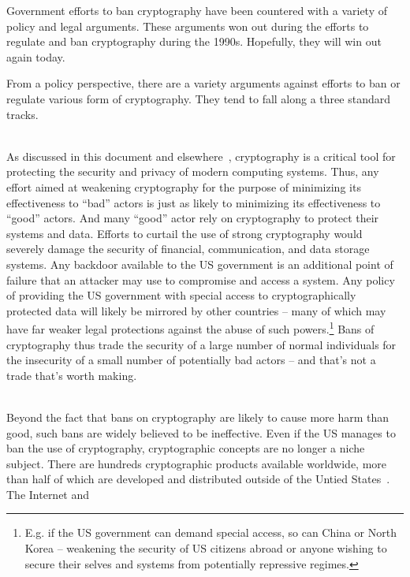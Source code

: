 Government efforts to ban cryptography have been countered with a
variety of policy and legal arguments. These arguments won out during
the efforts to regulate and ban cryptography during the
1990s. Hopefully, they will win out again today.

From a policy perspective, there are a variety arguments against
efforts to ban or regulate various form of cryptography. They tend to
fall along a three standard tracks.


\begin{packed_desc}
\item[More Harm Than Good] \hfill \\ As discussed in this document and
  elsewhere~\cite{abelson2015}, cryptography is a critical tool for
  protecting the security and privacy of modern computing
  systems. Thus, any effort aimed at weakening cryptography for the
  purpose of minimizing its effectiveness to ``bad'' actors is just as
  likely to minimizing its effectiveness to ``good'' actors. And many
  ``good'' actor rely on cryptography to protect their systems and
  data. Efforts to curtail the use of strong cryptography would
  severely damage the security of financial, communication, and data
  storage systems. Any backdoor available to the US government is an
  additional point of failure that an attacker may use to compromise
  and access a system. Any policy of providing the US government with
  special access to cryptographically protected data will likely be
  mirrored by other countries -- many of which may have far weaker
  legal protections against the abuse of such powers.\footnote{E.g. if
    the US government can demand special access, so can China or North
    Korea -- weakening the security of US citizens abroad or anyone
    wishing to secure their selves and systems from potentially
    repressive regimes.} Bans of cryptography thus trade the security
  of a large number of normal individuals for the insecurity of a
  small number of potentially bad actors -- and that's not a trade
  that's worth making.
\item[Ineffectiveness] \hfill \\ Beyond the fact that bans on
  cryptography are likely to cause more harm than good, such bans are
  widely believed to be ineffective. Even if the US manages to ban the
  use of cryptography, cryptographic concepts are no longer a niche
  subject. There are hundreds cryptographic products available
  worldwide, more than half of which are developed and distributed
  outside of the Untied States~\cite{schneier2016}. The Internet and

\end{packed_desc}
